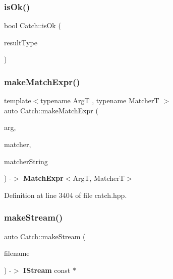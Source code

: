 \mbox{\label{namespace_catch_a5205869c81c06d3460759cb86676ae68}} 
\subsubsection{isOk()}
{\footnotesize\ttfamily bool Catch\+::is\+Ok (\begin{DoxyParamCaption}\item[{\textbf{ Result\+Was\+::\+Of\+Type}}]{result\+Type }\end{DoxyParamCaption})}

\mbox{\label{namespace_catch_a23a9a9a6dfef7ecd5e0eaf553fc52de6}} 
\subsubsection{makeMatchExpr()}
{\footnotesize\ttfamily template$<$typename ArgT , typename MatcherT $>$ \\
auto Catch\+::make\+Match\+Expr (\begin{DoxyParamCaption}\item[{ArgT const \&}]{arg,  }\item[{MatcherT const \&}]{matcher,  }\item[{\textbf{ String\+Ref} const \&}]{matcher\+String }\end{DoxyParamCaption}) -\/$>$ \textbf{ Match\+Expr}$<$ArgT, MatcherT$>$ }



Definition at line 3404 of file catch.\+hpp.

\mbox{\label{namespace_catch_af6d27462573d60c30c51acf1c980e3ff}} 
\subsubsection{makeStream()}
{\footnotesize\ttfamily auto Catch\+::make\+Stream (\begin{DoxyParamCaption}\item[{\textbf{ String\+Ref} const \&}]{filename }\end{DoxyParamCaption}) -\/$>$  \textbf{ I\+Stream} const $\ast$}

\mbox{\label{namespace_catch_a5e63df38d06a43d4cee17454e724b5c0}} 
